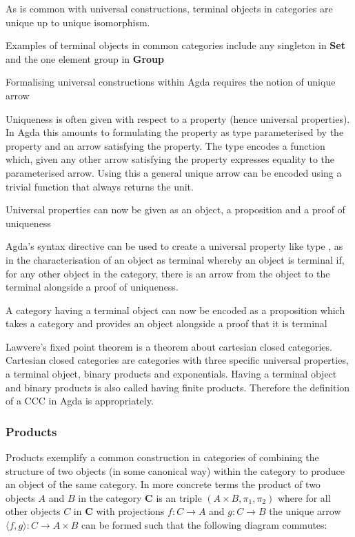 As is common with universal constructions, terminal objects in categories are
unique up to unique isomorphism.

Examples of terminal objects in common categories include any singleton in
\textbf{Set} and the one element group in \textbf{Group}

Formalising universal constructions within Agda requires the notion of unique
arrow


Uniqueness is often given with respect to a property (hence universal
properties). In Agda this amounts to formulating the property as type
parameterised by the property and an arrow satisfying the property. The type
encodes a function which, given any other arrow satisfying the property
expresses equality to the parameterised arrow. Using this a general unique arrow
can be encoded using a trivial function that always returns the unit.

Universal properties can now be given as an object, a proposition and a proof of
uniqueness


Agda's syntax directive can be used to create a universal property like type
, as in the characterisation of an object as terminal whereby an
object is terminal if, for any other object in the category, there is an arrow
from the object to the terminal alongside a proof of uniqueness.


A category having a terminal object can now be encoded as a proposition which
takes a category and provides an object alongside a proof that it is terminal


Lawvere's fixed point theorem is a theorem about cartesian closed categories.
Cartesian closed categories are categories with three specific universal
properties, a terminal object, binary products and exponentials. Having a terminal
object and binary products is also called having finite products. Therefore the
definition of a CCC in Agda is appropriately.


\subsubsection{Products}
Products exemplify a common construction in categories of combining the
structure of two objects (in some canonical way) within the category to produce
an object of the same category. In more concrete terms the product of two
objects $A$ and $B$ in the category $\textbf{C}$ is an triple $(A \times B,
\pi_{1}, \pi_{2})$ where for all other objects $C$ in $\textbf{C}$ with
projections $f: C \rightarrow A$ and $g: C \rightarrow B$ the unique arrow
$\langle f, g\rangle : C \rightarrow A \times B$ can be formed such that the
following diagram commutes:

